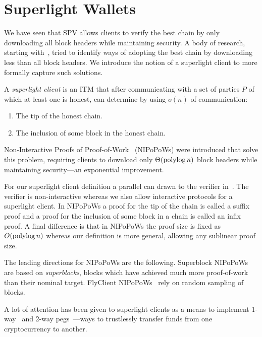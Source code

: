 \section{Superlight Wallets}
\label{superlight}
We have seen that SPV allows clients to verify the best chain by only downloading all block headers while maintaining security. A body of research, starting with~\cite{highway,friedenbach}, tried to identify ways of adopting the best chain by downloading less than all block headers. We introduce the notion of a superlight client to more formally capture such solutions. 

\begin{definition}
A \emph{superlight client} is an ITM that after communicating with a set of parties $P$ of which at least one is honest, can determine by using $o(n)$ of communication:
\begin{enumerate}
    \item The tip of the honest chain.
    \item The inclusion of some block in the honest chain.
\end{enumerate}
\end{definition}

Non-Interactive Proofs of Proof-of-Work~\cite{kls,nipopows,flyclient} (NIPoPoWs) were introduced that solve this problem, requiring clients to download only $\Theta(\operatorname{polylog}{n})$ block headers while maintaining security---an exponential improvement.

For our superlight client definition a parallel can drawn to the verifier in~\cite{nipopows}. The verifier is non-interactive whereas we also allow interactive protocols for a superlight client. In NIPoPoWs a proof for the tip of the chain is called a suffix proof and a proof for the inclusion of some block in a chain is called an infix proof. A final difference is that in NIPoPoWs the proof size is fixed as $O(\operatorname{polylog}{n})$ whereas our definition is more general, allowing any sublinear proof size.

The leading directions for NIPoPoWs are the following.
Superblock NIPoPoWs~\cite{nipopows,compactsuperblocks} are based on \emph{superblocks}, blocks which have achieved much more proof-of-work than their nominal target. FlyClient NIPoPoWs~\cite{flyclient} rely on random sampling of blocks.

A lot of attention has been given to superlight clients as a means to implement 1-way~\cite{burn} and 2-way pegs~\cite{pow-sidechains}---ways to trustlessly transfer funds from one cryptocurrency to another.

